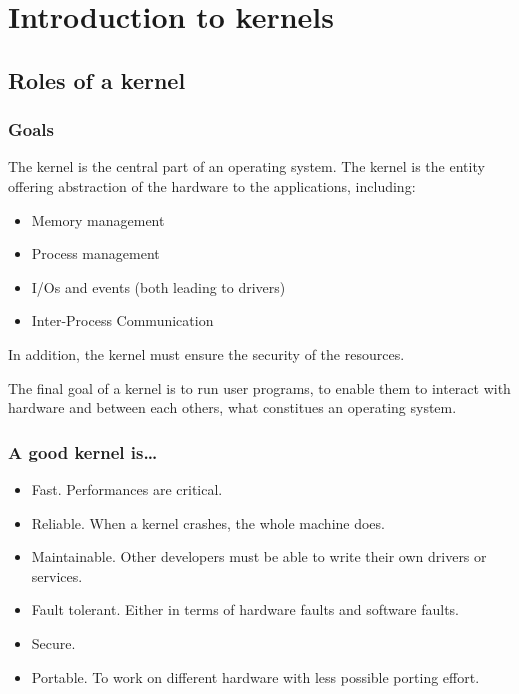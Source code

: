 \section{Introduction to kernels}

%
%

\subsection{Roles of a kernel}

\begin{frame}
  \frametitle{Goals}

  The kernel is the central part of an operating system. The kernel is
  the entity offering abstraction of the hardware to the applications,
  including:

  \begin{itemize}
  \item
    Memory management
  \item
    Process management
  \item
    I/Os and events (both leading to drivers)
  \item
    Inter-Process Communication
  \end{itemize}

  In addition, the kernel must ensure the security of the resources.

  \-

  The final goal of a kernel is to run user programs, to enable them
  to interact with hardware and between each others, what constitues
  an operating system.

\end{frame}

\begin{frame}
  \frametitle{A good kernel is\ldots}

  \begin{itemize}
  \item
    Fast. Performances are critical.
  \item
    Reliable. When a kernel crashes, the whole machine does.
  \item
    Maintainable. Other developers must be able to write their own
    drivers or services.
  \item
    Fault tolerant. Either in terms of hardware faults and software
    faults.
  \item
    Secure.
  \item
    Portable. To work on different hardware with less possible porting
    effort.
  \end{itemize}

\end{frame}

